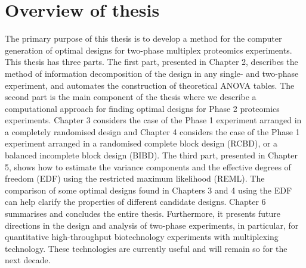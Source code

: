 \section{Overview of thesis}
\label{sec:overview}
The primary purpose of this thesis is to develop a method for the computer generation of optimal designs for two-phase multiplex proteomics experiments. This thesis has three parts. The first part, presented in Chapter 2, describes the method of information decomposition of the design in any single- and two-phase experiment, and automates the construction of theoretical ANOVA tables. The second part is the main component of the thesis where we describe a computational approach for finding optimal designs for Phase 2 proteomics experiments. Chapter 3 considers the case of the Phase 1 experiment arranged in a completely randomised design and Chapter 4 considers the case of the Phase 1 experiment arranged in a randomised complete block design (RCBD), or a balanced incomplete block design (BIBD). The third part, presented in Chapter 5, shows how to estimate the variance components and the effective degrees of freedom (EDF) using the restricted maximum likelihood (REML). The comparison of some optimal designs found in Chapters 3 and 4 using the EDF can help clarify the properties of different candidate designs. Chapter 6 summarises and concludes the entire thesis. Furthermore, it presents future directions in the design and analysis of two-phase experiments, in particular, for quantitative high-throughput biotechnology experiments with multiplexing technology. These technologies are currently useful and will remain so for the next decade.


%
%

%
